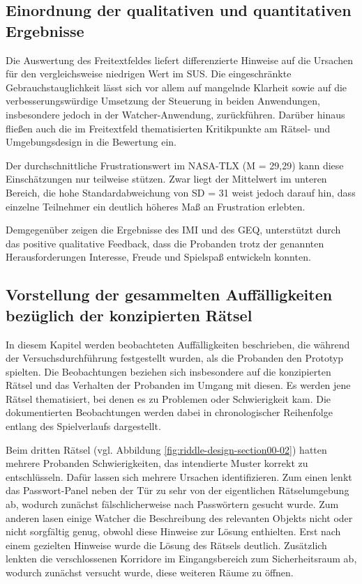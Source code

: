 \subsection{Einordnung der qualitativen und quantitativen Ergebnisse}

Die Auswertung des Freitextfeldes liefert differenzierte Hinweise auf die Ursachen für den vergleichsweise niedrigen Wert im \ac{SUS}. Die eingeschränkte Gebrauchstauglichkeit lässt sich vor allem auf mangelnde Klarheit sowie auf die verbesserungswürdige Umsetzung der Steuerung in beiden Anwendungen, insbesondere jedoch in der Watcher-Anwendung, zurückführen. Darüber hinaus fließen auch die im Freitextfeld thematisierten Kritikpunkte am Rätsel- und Umgebungsdesign in die Bewertung ein.

Der durchschnittliche Frustrationswert im \ac{NASA-TLX} (M = 29,29) kann diese Einschätzungen nur teilweise stützen. Zwar liegt der Mittelwert im unteren Bereich, die hohe Standardabweichung von SD = 31 weist jedoch darauf hin, dass einzelne Teilnehmer ein deutlich höheres Maß an Frustration erlebten.

Demgegenüber zeigen die Ergebnisse des \ac{IMI} und des \ac{GEQ}, unterstützt durch das positive qualitative Feedback, dass die Probanden trotz der genannten Herausforderungen Interesse, Freude und Spielspaß entwickeln konnten.

\subsection{Vorstellung der gesammelten Auffälligkeiten bezüglich der konzipierten Rätsel}

In diesem Kapitel werden beobachteten Auffälligkeiten beschrieben, die während der Versuchsdurchführung festgestellt wurden, als die Probanden den Prototyp spielten. Die Beobachtungen beziehen sich insbesondere auf die konzipierten Rätsel und das Verhalten der Probanden im Umgang mit diesen. Es werden jene Rätsel thematisiert, bei denen es zu Problemen oder Schwierigkeit kam. Die dokumentierten Beobachtungen werden dabei in chronologischer Reihenfolge entlang des Spielverlaufs dargestellt.

Beim dritten Rätsel (vgl. Abbildung \ref{fig:riddle-design-section00-02}) hatten mehrere Probanden Schwierigkeiten, das intendierte Muster korrekt zu entschlüsseln. Dafür lassen sich mehrere Ursachen identifizieren. Zum einen lenkt das Passwort-Panel neben der Tür zu sehr von der eigentlichen Rätselumgebung ab, wodurch zunächst fälschlicherweise nach Passwörtern gesucht wurde. Zum anderen lasen einige Watcher die Beschreibung des relevanten Objekts nicht oder nicht sorgfältig genug, obwohl diese Hinweise zur Lösung enthielten. Erst nach einem gezielten Hinweise wurde die Lösung des Rätsels deutlich. Zusätzlich lenkten die verschlossenen Korridore im Eingangsbereich zum Sicherheitsraum ab, wodurch zunächst versucht wurde, diese weiteren Räume zu öffnen.

